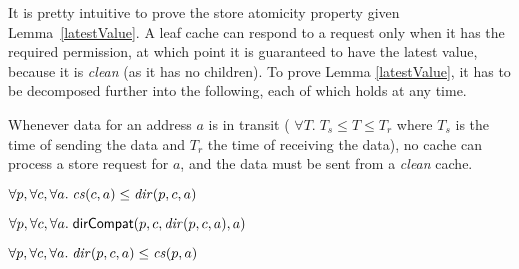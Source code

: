 It is pretty intuitive to prove the store atomicity property given
Lemma~\ref{latestValue}. A leaf cache can respond to a request only when it
has the required permission, at which point it is guaranteed to have the latest
value, because it is \textit{clean} (as it has no children). To prove Lemma
\ref{latestValue}, it has to be decomposed further into the following, each of
which holds at any time.


\begin{lemma}[noTransitWrite] Whenever data for an address $a$ is in transit (\ie{}
$\forall T. \; T_s \le T \le T_r$ where $T_s$ is the time of sending the data and
$T_r$ the time of receiving the data), no cache can process a store request for
$a$, and the data must be sent from a \textit{clean} cache.
\label{noTransitWrite}
\end{lemma}

\begin{lemma}%
$\forall p, \forall c, \forall a.\;\mathit{cs}(c, a) \le \mathit{dir}(p, c, a)$
\label{conservative}
\end{lemma}

\begin{lemma}%
$\forall p, \forall c, \forall a.\; \mathsf{dirCompat}(p, c, \mathit{dir}(p,c,a), a)$
\end{lemma}

\begin{lemma}%
$\forall p, \forall c, \forall a.\; \mathit{dir}(p,c,a) \le \mathit{cs}(p, a)$
\end{lemma}


